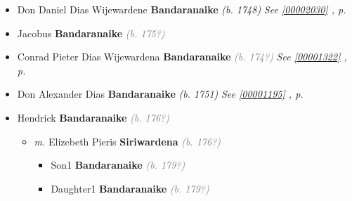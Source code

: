 \documentclass[10pt, openany]{book}
\begin{document}
\begin{itemize}
{\begin{itemize}
{\begin{itemize}
\end{itemize}
  }
\item{Don Daniel Dias Wijewardene \textbf{Bandaranaike} \textcolor{slorange}{\textit{(b. 1748)}} \textcolor{slteal}{\textit{See  \autoref{00002030} \textit{, p. \pageref{00002030} }}}}
\item{Jacobus \textbf{Bandaranaike} \textcolor{gray}{\textit{(b. 175?)}}
 }
\item{Conrad Pieter Dias Wijewardena \textbf{Bandaranaike} \textcolor{gray}{\textit{(b. 174?)}} \textcolor{slteal}{\textit{See  \autoref{00001322} \textit{, p. \pageref{00001322} }}}}
\item{Don Alexander Dias \textbf{Bandaranaike} \textcolor{slorange}{\textit{(b. 1751)}} \textcolor{slteal}{\textit{See  \autoref{00001195} \textit{, p. \pageref{00001195} }}}}
\item{Hendrick \textbf{Bandaranaike} \textcolor{gray}{\textit{(b. 176?)}}
\begin{itemize}
\item{\textit{m.} Elizebeth Pieris \textbf{Siriwardena} \textcolor{gray}{\textit{(b. 176?)}}   \label{couple:00001291:00001297} \begin{itemize}
\item{Son1 \textbf{Bandaranaike} \textcolor{gray}{\textit{(b. 179?)}}
 }
\item{Daughter1 \textbf{Bandaranaike} \textcolor{gray}{\textit{(b. 179?)}}
 }
\end{itemize}}
\end{itemize}
 }
\end{itemize}}
\end{itemize}
    
\end{document}
